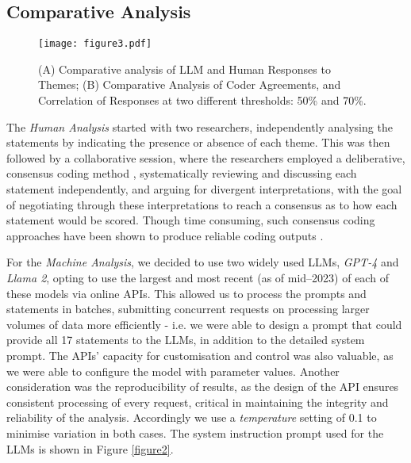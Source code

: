 \documentclass{article}
\begin{document}
\subsection{Comparative Analysis}\label{comparative-analysis}

\begin{figure*}[ht]
\vskip 0.2in
\begin{center}
\centerline{\texttt{[image: figure3.pdf]}}
\caption{(A) Comparative analysis of LLM and Human Responses to Themes; (B) Comparative Analysis of Coder Agreements, and Correlation of Responses at two different thresholds: 50\% and 70\%.}
\label{figure3}
\end{center}
\vskip -0.2in
\end{figure*}


The \emph{Human Analysis} started with two researchers, independently analysing the statements by indicating the presence or absence of each theme. This was then followed by a collaborative session, where the researchers employed a deliberative, consensus coding method \cite{richardsPracticalGuideCollaborative2018}, systematically reviewing and discussing each statement independently, and arguing for divergent interpretations, with the goal of negotiating through these interpretations to  reach a consensus as to how each statement would be scored. Though time consuming, such consensus coding approaches have been shown to produce reliable coding outputs \cite{richardsPracticalGuideCollaborative2018}.  

For the \emph{Machine Analysis}, we decided to use two widely used LLMs, \emph{GPT-4} and \emph{Llama 2}, opting to use the largest and most recent (as of mid–2023) of each of these models via online APIs. This allowed us to process the prompts and statements in batches, submitting concurrent requests on processing larger volumes of data more efficiently - i.e. we were able to design a prompt that could provide all 17 statements to the LLMs, in addition to the detailed system prompt. The APIs' capacity for customisation and control was also valuable, as we were able to configure the model with parameter values. Another consideration was the reproducibility of results, as the design of the API ensures consistent processing of every request, critical in maintaining the integrity and reliability of the analysis. Accordingly we use a \textit{temperature} setting of 0.1 to minimise variation in both cases. The system instruction prompt \cite{liammageeLLMBiasDetector2023} used for the LLMs is shown in Figure \ref{figure2}.
\end{document}

